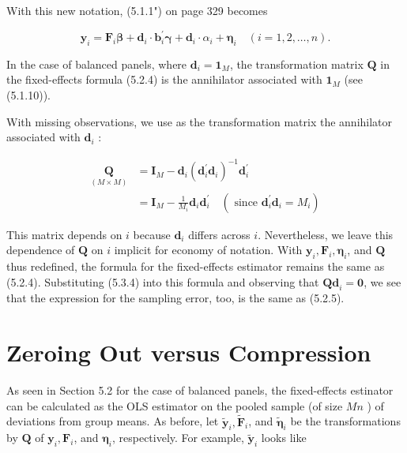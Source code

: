 \documentclass[10pt]{article}
\begin{document}
With this new notation, (5.1.1") on page 329 becomes


\begin{equation*}
\mathbf{y}_{i}=\mathbf{F}_{i} \boldsymbol{\beta}+\mathbf{d}_{i} \cdot \mathbf{b}_{i}^{\prime} \boldsymbol{\gamma}+\mathbf{d}_{i} \cdot \alpha_{i}+\boldsymbol{\eta}_{i} \quad(i=1,2, \ldots, n) . \tag{5.3.4}
\end{equation*}


In the case of balanced panels, where $\mathbf{d}_{i}=\mathbf{1}_{M}$, the transformation matrix $\mathbf{Q}$ in the fixed-effects formula (5.2.4) is the annihilator associated with $\mathbf{1}_{M}$ (see (5.1.10)).

With missing observations, we use as the transformation matrix the annihilator associated with $\mathbf{d}_{i}$ :


\begin{align*}
\underset{(M \times M)}{\mathbf{Q}} & =\mathbf{I}_{M}-\mathbf{d}_{i}\left(\mathbf{d}_{i}^{\prime} \mathbf{d}_{i}\right)^{-1} \mathbf{d}_{i}^{\prime} \\
& =\mathbf{I}_{M}-\frac{1}{M_{i}} \mathbf{d}_{i} \mathbf{d}_{i}^{\prime} \quad\left(\text { since } \mathbf{d}_{i}^{\prime} \mathbf{d}_{i}=M_{i}\right) \tag{5.3.5}
\end{align*}


This matrix depends on $i$ because $\mathbf{d}_{i}$ differs across $i$. Nevertheless, we leave this dependence of $\mathbf{Q}$ on $i$ implicit for economy of notation. With $\mathbf{y}_{i}, \mathbf{F}_{i}, \boldsymbol{\eta}_{i}$, and $\mathbf{Q}$ thus redefined, the formula for the fixed-effects estimator remains the same as (5.2.4). Substituting (5.3.4) into this formula and observing that $\mathbf{Q d}_{i}=\mathbf{0}$, we see that the expression for the sampling error, too, is the same as (5.2.5).

\section*{Zeroing Out versus Compression}
As seen in Section 5.2 for the case of balanced panels, the fixed-effects estinator can be calculated as the OLS estimator on the pooled sample (of size $M n$ ) of deviations from group means. As before, let $\tilde{\mathbf{y}}_{i}, \tilde{\mathbf{F}}_{i}$, and $\tilde{\boldsymbol{\eta}}_{i}$ be the transformations by $\mathbf{Q}$ of $\mathbf{y}_{i}, \mathbf{F}_{i}$, and $\boldsymbol{\eta}_{i}$, respectively. For example, $\tilde{\mathbf{y}}_{i}$ looks like
\end{document}
